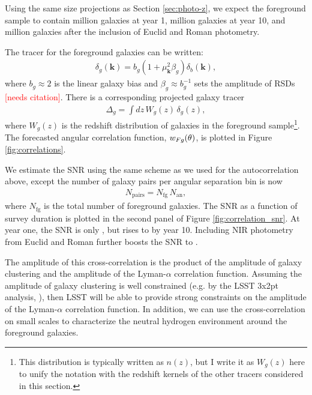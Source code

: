 \documentclass[twocolumn]{aastex631}
\newcommand{\note}[1]{\textsf{\textcolor{red}{#1}}\xspace}
\newcommand{\needscite}{\note{[needs citation]}}
\newcommand{\lya}{Lyman-$\alpha$\xspace}
\begin{document}
Using the same size projections as Section \ref{sec:photo-z}, we expect the foreground sample to contain  million galaxies at year 1,  million galaxies at year 10, and  million galaxies after the inclusion of Euclid and Roman photometry.

The tracer for the foreground galaxies can be written:
\begin{align}
    \delta_g(\textbf{k}) = b_g (1 + \mu_\textbf{k}^2 \beta_g) \delta_b(\textbf{k}),
    \label{eq:galaxy-tracer}
\end{align}
where $b_g \approx 2$ is the linear galaxy bias and $\beta_g \approx b_g^{-1}$ sets the amplitude of RSDs \needscite.
There is a corresponding projected galaxy tracer
\begin{align}
    \Delta_g = \int dz \, W_g(z) \, \delta_g(z),
\end{align}
where $W_g(z)$ is the redshift distribution of galaxies in the foreground sample\footnote{This distribution is typically written as $n(z)$, but I write it as $W_g(z)$ here to unify the notation with the redshift kernels of the other tracers considered in this section.}.
The forecasted angular correlation function, $w_{\small Fg}(\theta)$, is plotted in Figure \ref{fig:correlations}.

We estimate the SNR using the same scheme as we used for the autocorrelation above, except the number of galaxy pairs per angular separation bin is now 
\begin{align}
    N_\text{pairs} = N_\text{fg} \, N_\text{an},
\end{align}
where $N_\text{fg}$ is the total number of foreground galaxies.
The SNR as a function of survey duration is plotted in the second panel of Figure \ref{fig:correlation_snr}.
At year one, the SNR is only , but rises to  by year 10.
Including NIR photometry from Euclid and Roman further boosts the SNR to .

The amplitude of this cross-correlation is the product of the amplitude of galaxy clustering and the amplitude of the \lya correlation function.
Assuming the amplitude of galaxy clustering is well constrained (e.g. by the LSST 3x2pt analysis, \citealt{descSRD}), then LSST will be able to provide strong constraints on the amplitude of the \lya correlation function.
In addition, we can use the cross-correlation on small scales to characterize the neutral hydrogen environment around the foreground galaxies.
\end{document}
